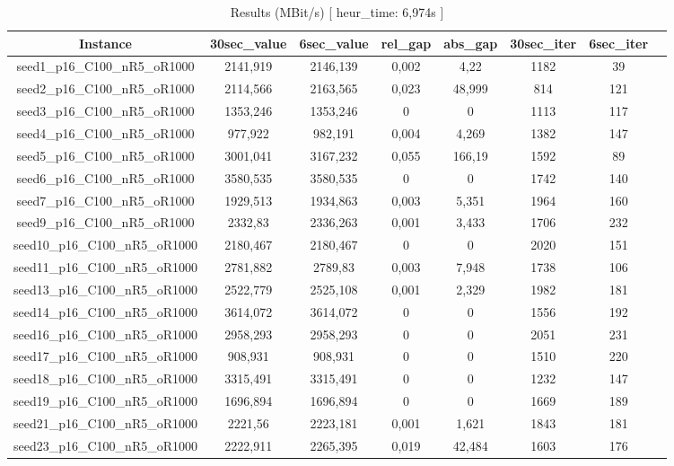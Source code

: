 \documentclass[a4paper]{article}
\begin{document}
\begin{center}
\begin{longtable}{cccccccc}
\caption{Results (MBit/s) [ heur\_time: 6,974s ] }
\tabularnewline
\hline
Instance & 30sec\_value & 6sec\_value & rel\_gap & abs\_gap & 30sec\_iter & 6sec\_iter\\
\hline
seed1\_p16\_C100\_nR5\_oR1000 & 2141,919 & 2146,139 & 0,002 & 4,22 & 1182 & 39\\
\hline
seed2\_p16\_C100\_nR5\_oR1000 & 2114,566 & 2163,565 & 0,023 & 48,999 & 814 & 121\\
\hline
seed3\_p16\_C100\_nR5\_oR1000 & 1353,246 & 1353,246 & 0 & 0 & 1113 & 117\\
\hline
seed4\_p16\_C100\_nR5\_oR1000 & 977,922 & 982,191 & 0,004 & 4,269 & 1382 & 147\\
\hline
seed5\_p16\_C100\_nR5\_oR1000 & 3001,041 & 3167,232 & 0,055 & 166,19 & 1592 & 89\\
\hline
seed6\_p16\_C100\_nR5\_oR1000 & 3580,535 & 3580,535 & 0 & 0 & 1742 & 140\\
\hline
seed7\_p16\_C100\_nR5\_oR1000 & 1929,513 & 1934,863 & 0,003 & 5,351 & 1964 & 160\\
\hline
seed9\_p16\_C100\_nR5\_oR1000 & 2332,83 & 2336,263 & 0,001 & 3,433 & 1706 & 232\\
\hline
seed10\_p16\_C100\_nR5\_oR1000 & 2180,467 & 2180,467 & 0 & 0 & 2020 & 151\\
\hline
seed11\_p16\_C100\_nR5\_oR1000 & 2781,882 & 2789,83 & 0,003 & 7,948 & 1738 & 106\\
\hline
seed13\_p16\_C100\_nR5\_oR1000 & 2522,779 & 2525,108 & 0,001 & 2,329 & 1982 & 181\\
\hline
seed14\_p16\_C100\_nR5\_oR1000 & 3614,072 & 3614,072 & 0 & 0 & 1556 & 192\\
\hline
seed16\_p16\_C100\_nR5\_oR1000 & 2958,293 & 2958,293 & 0 & 0 & 2051 & 231\\
\hline
seed17\_p16\_C100\_nR5\_oR1000 & 908,931 & 908,931 & 0 & 0 & 1510 & 220\\
\hline
seed18\_p16\_C100\_nR5\_oR1000 & 3315,491 & 3315,491 & 0 & 0 & 1232 & 147\\
\hline
seed19\_p16\_C100\_nR5\_oR1000 & 1696,894 & 1696,894 & 0 & 0 & 1669 & 189\\
\hline
seed21\_p16\_C100\_nR5\_oR1000 & 2221,56 & 2223,181 & 0,001 & 1,621 & 1843 & 181\\
\hline
seed23\_p16\_C100\_nR5\_oR1000 & 2222,911 & 2265,395 & 0,019 & 42,484 & 1603 & 176\\

\end{longtable}
\end{center}
\end{document}
